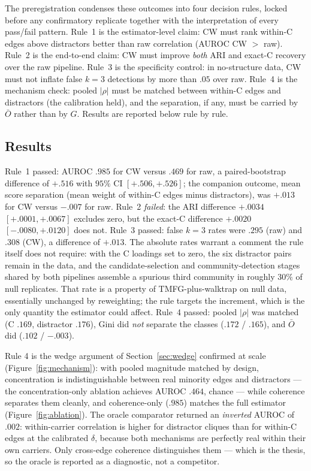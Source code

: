 \documentclass[11pt]{article}
\newcommand{\Obar}{\bar{O}}
\begin{document}
The preregistration condenses these outcomes into four decision rules,
locked before any confirmatory replicate together with the interpretation
of every pass/fail pattern. Rule~1 is the estimator-level claim: CW must
rank within-C edges above distractors better than raw correlation (AUROC CW $>$
raw). Rule~2 is the end-to-end claim: CW must improve \emph{both} ARI and
exact-C recovery over the raw pipeline. Rule~3 is the specificity control:
in no-structure data, CW must not inflate false $k{=}3$ detections by more
than $.05$ over raw. Rule~4 is the mechanism check: pooled $|\rho|$ must
be matched between within-C edges and distractors (the calibration held), and the
separation, if any, must be carried by $\Obar$ rather than by $G$. Results
are reported below rule by rule.

\subsection{Results}\label{sec:results}
Rule~1 passed: AUROC $.985$ for CW versus $.469$ for raw, a
paired-bootstrap difference of $+.516$ with $95\%$ CI $[+.506,+.526]$;
the companion outcome, mean score separation (mean weight of within-C
edges minus distractors), was $+.013$ for CW versus $-.007$ for raw.
Rule~2 \emph{failed}: the ARI difference $+.0034$ $[+.0001,+.0067]$
excludes zero, but the exact-C difference $+.0020$ $[-.0080,+.0120]$
does not. Rule~3 passed: false $k{=}3$ rates were $.295$ (raw) and
$.308$ (CW), a difference of $+.013$. The absolute rates warrant a
comment the rule itself does not require: with the C loadings set to
zero, the six distractor pairs remain in the data, and the
candidate-selection and community-detection stages shared by both
pipelines assemble a spurious third community in roughly $30\%$ of null
replicates. That rate is a property of TMFG-plus-walktrap on null data,
essentially unchanged by reweighting; the rule targets the increment,
which is the only quantity the estimator could affect. Rule~4 passed: pooled $|\rho|$ was
matched (C $.169$, distractor $.176$), Gini did \emph{not} separate the
classes ($.172$ / $.165$), and $\Obar$ did ($.102$ / $-.003$).

Rule 4 is the wedge argument of Section~\ref{sec:wedge} confirmed at scale
(Figure~\ref{fig:mechanism}): with pooled magnitude matched by design,
concentration is indistinguishable between real minority edges and
distractors --- the concentration-only ablation achieves AUROC $.464$,
chance --- while coherence separates them cleanly, and coherence-only
($.985$) matches the full estimator (Figure~\ref{fig:ablation}). The
oracle comparator returned an
\emph{inverted} AUROC of $.002$: within-carrier correlation is higher for
distractor cliques than for within-C edges at the calibrated $\delta$, because
both mechanisms are perfectly real within their own carriers. Only
cross-edge coherence distinguishes them --- which is the thesis, so the
oracle is reported as a diagnostic, not a competitor.
\end{document}
